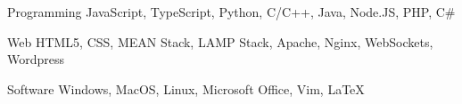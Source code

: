 


\begin{cvskills}


\cvskill
{Programming} %
{JavaScript, TypeScript, Python, C/C++, Java, Node.JS, PHP, C\#} %


\cvskill
{Web} %
{HTML5, CSS, MEAN Stack, LAMP Stack, Apache, Nginx, WebSockets, Wordpress} %


\cvskill
{Software} %
{Windows, MacOS, Linux, Microsoft Office, Vim, LaTeX} %


\end{cvskills}
